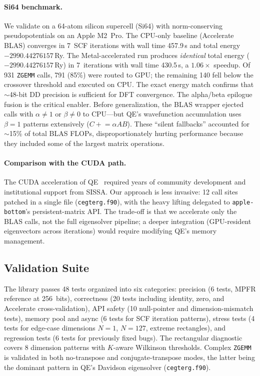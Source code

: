 \documentclass[conference]{IEEEtran}
\newcommand{\ZGEMM}{\texttt{ZGEMM}}
\newcommand{\AB}{\texttt{apple-bottom}}
\begin{document}
\paragraph{Si64 benchmark.} We validate on a 64-atom silicon supercell (Si64) with norm-conserving pseudopotentials on an Apple M2~Pro. The CPU-only baseline (Accelerate BLAS) converges in 7~SCF iterations with wall time 457.9\,s and total energy $-2990.44276157$\,Ry. The Metal-accelerated run produces \emph{identical} total energy ($-2990.44276157$\,Ry) in 7~iterations with wall time 430.5\,s, a $1.06{\times}$ speedup. Of 931 \ZGEMM{} calls, 791 (85\%) were routed to GPU; the remaining 140 fell below the crossover threshold and executed on CPU. The exact energy match confirms that ${\sim}$48-bit DD precision is sufficient for DFT convergence.
The alpha/beta epilogue fusion is the critical enabler. Before generalization, the BLAS wrapper ejected calls with $\alpha \neq 1$ or $\beta \neq 0$ to CPU---but QE's wavefunction accumulation uses $\beta{=}1$ patterns extensively ($C \mathrel{+}= \alpha A B$). These ``silent fallbacks'' accounted for ${\sim}$15\% of total BLAS FLOPs, disproportionately hurting performance because they included some of the largest matrix operations.
\paragraph{Comparison with the CUDA path.} The CUDA acceleration of QE~\cite{QE-GPU} required years of community development and institutional support from SISSA. Our approach is less invasive: 12 call sites patched in a single file (\texttt{cegterg.f90}), with the heavy lifting delegated to \AB{}'s persistent-matrix API. The trade-off is that we accelerate only the BLAS calls, not the full eigensolver pipeline; a deeper integration (GPU-resident eigenvectors across iterations) would require modifying QE's memory management.
\subsection{Validation Suite}
The library passes 48 tests organized into six categories: precision (6 tests, MPFR reference at 256~bits), correctness (20 tests including identity, zero, and Accelerate cross-validation), API safety (10 null-pointer and dimension-mismatch tests), memory pool and async (6 tests for SCF iteration patterns), stress tests (4 tests for edge-case dimensions $N{=}1$, $N{=}127$, extreme rectangles), and regression tests (6 tests for previously fixed bugs). The rectangular diagnostic covers 8 dimension patterns with $K$-aware Wilkinson thresholds.
Complex \ZGEMM{} is validated in both no-transpose and conjugate-transpose modes, the latter being the dominant pattern in QE's Davidson eigensolver (\texttt{cegterg.f90}).
\end{document}
